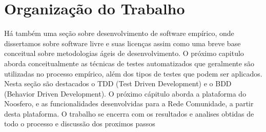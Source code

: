 	\section{Organização do Trabalho}
	
	Há também uma seção sobre desenvolvimento de software empírico, onde dissertamos sobre software livre 
	e suas licenças assim como uma breve base conceitual sobre metodologias ágeis de desenvolvimento.
	O próximo capitulo aborda conceitualmente as técnicas de testes automatizados que geralmente
	são utilizadas no processo empírico, além dos tipos de testes que podem ser aplicados. Nesta seção são 
	destacados o TDD (Test Driven Development) e o BDD (Behavior Driven Development).
	O próximo cápitulo aborda a plataforma do Noosfero, e as funcionalidades desenvolvidas para a Rede Comunidade, a partir desta plataforma.
	O trabalho se encerra com os resultados e analises obtidas de todo o processo e discussão dos proximos passos


